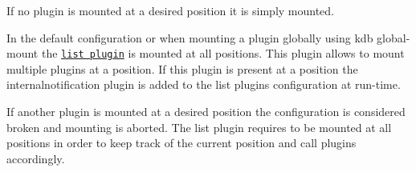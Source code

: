 \begin{DoxyItemize}
\item If no plugin is mounted at a desired position it is simply mounted.
\item In the default configuration or when mounting a plugin globally using {\ttfamily kdb global-\/mount} the \href{https://www.libelektra.org/plugins/list}{\tt list plugin} is mounted at all positions. This plugin allows to mount multiple plugins at a position. If this plugin is present at a position the internalnotification plugin is added to the list plugin\textquotesingle{}s configuration at run-\/time.
\item If another plugin is mounted at a desired position the configuration is considered broken and mounting is aborted. The list plugin requires to be mounted at all positions in order to keep track of the current position and call plugins accordingly. 
\end{DoxyItemize}